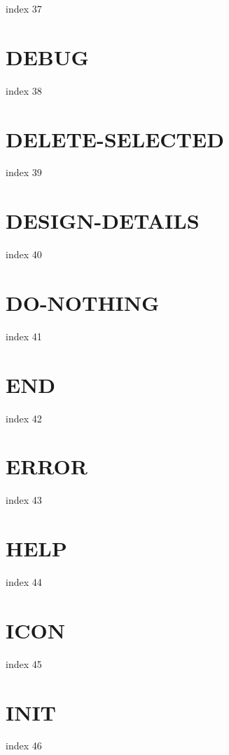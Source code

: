 \documentclass[10pt]{report}
\begin{document}
index 37

\section{DEBUG}

index 38

\section{DELETE-SELECTED}

index 39

\section{DESIGN-DETAILS}

index 40

\section{DO-NOTHING}

index 41

\section{END}

index 42

\section{ERROR}

index 43

\section{HELP}

index 44

\section{ICON}

index 45

\section{INIT}

index 46
\end{document}

